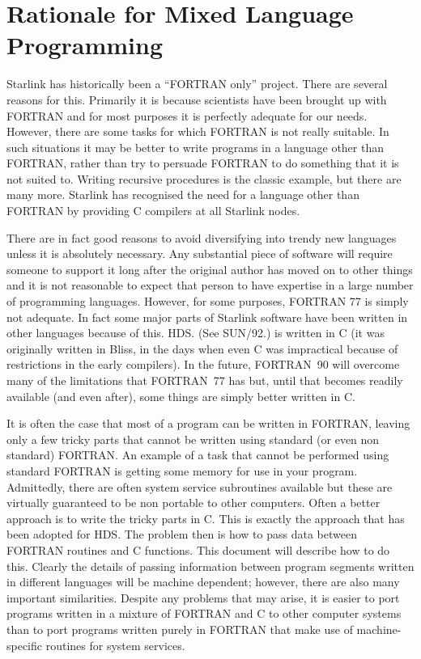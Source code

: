 \documentclass[twoside,11pt]{article}
\newcommand{\latex}[1]{#1}
\newcommand{\xref}[3]{#1}
\newcommand{\xlabel}[1]{}
\renewcommand{\_}{\texttt{\symbol{95}}}
\begin{document}
\newpage

\section{\xlabel{rationale_for_mixed_language_programming}\label{rationale}Rationale for Mixed Language Programming}
Starlink has historically been a ``FORTRAN only'' project. There are several
reasons for this. Primarily it is because scientists have been brought up with
FORTRAN and for most purposes it is perfectly adequate for our needs. However,
there are some tasks for which FORTRAN is not really suitable. In such
situations it may be better to write programs in a language other than FORTRAN,
rather than try to persuade FORTRAN to do something that it is not suited to.
Writing recursive procedures is the classic example, but there are many more.
Starlink has recognised the need for a language other than FORTRAN by providing
C compilers at all Starlink nodes. 

There are in fact good reasons to avoid diversifying into trendy new languages
unless it is absolutely necessary. Any substantial piece of software will
require someone to support it long after the original author has moved on to
other things and it is not reasonable to expect that person to have expertise
in a large number of programming languages. However, for some purposes, FORTRAN
77 is simply not adequate. In fact some major parts of Starlink software have
been written in other languages because of this. 
\xref{HDS\@.}{sun92}{} \latex{(See SUN/92.)}
is written in C (it was originally written in Bliss, in the days when even C 
was impractical because of restrictions in the early compilers).
In the future, FORTRAN~90 will overcome many of the limitations that 
FORTRAN~77 has but, until that becomes readily available (and even after), 
some things are simply better written in C\@.

It is often the case that most of a program can be written in FORTRAN, leaving
only a few tricky parts that cannot be written using standard (or even non
standard) FORTRAN\@. An example of a task that cannot be performed using 
standard FORTRAN is getting some memory for use in your program. 
Admittedly, there are often system service subroutines available but these are
virtually guaranteed to be non portable to other computers.
Often a better approach is to write the tricky parts in C\@. This is exactly the
approach that has been adopted for HDS.
The problem then is how to pass data between FORTRAN routines and C functions.
This document will describe  how to do this. 
Clearly the details of passing information between program segments
written in different languages will be machine dependent; however, there are
also many important similarities. Despite any problems that may arise, it is
easier to port programs written in a mixture of FORTRAN and C to other computer
systems than to port programs written purely in FORTRAN that make use of
machine-specific routines for system services. 
\end{document}
